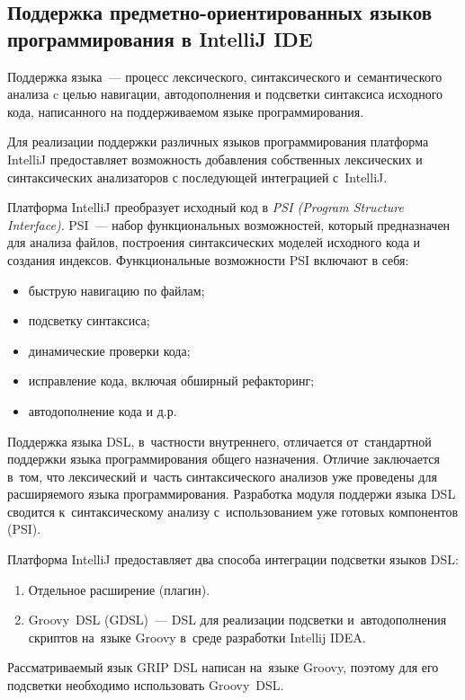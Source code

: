 \subsection{Поддержка предметно-ориентированных языков программирования в IntelliJ IDE} \label{sub132}

Поддержка языка~--- процесс лексического, синтаксического и~семантического анализа c целью навигации, автодополнения и подсветки синтаксиса исходного кода, написанного на поддерживаемом языке программирования. 

Для реализации поддержки различных языков программирования платформа IntelliJ предоставляет возможность добавления собственных лексических и синтаксических анализаторов с последующей интеграцией с~IntelliJ.

Платформа IntelliJ преобразует исходный код в \textit{PSI (Program Structure Interface)}. PSI~--- набор функциональных возможностей, который предназначен для анализа файлов, построения синтаксических моделей исходного кода и создания индексов. Функциональные возможности PSI включают в себя:

\begin{itemize}
\item{быструю навигацию по файлам;}
\item{подсветку синтаксиса;}
\item{динамические проверки кода;}
\item{исправление кода, включая обширный рефакторинг;}
\item{автодополнение кода и д.р.}
\end{itemize}

Поддержка языка DSL, в~частности внутреннего, отличается от~стандартной поддержки языка программирования общего назначения. Отличие заключается в~том, что лексический и~часть синтаксического анализов уже проведены для расширяемого языка программирования. Разработка модуля поддержи языка DSL сводится к~синтаксическому анализу с~использованием уже готовых компонентов (PSI).

Платформа IntelliJ предоставляет два способа интеграции подсветки языков DSL:
\begin{enumerate}
	\item{Отдельное расширение (плагин).}
	\item{Groovy~DSL (GDSL)~--- DSL для реализации подсветки и~автодополнения скриптов на~языке Groovy в~среде разработки
Intellij IDEA.}
\end{enumerate}

Рассматриваемый язык GRIP DSL написан на~языке Groovy, поэтому для его подсветки необходимо использовать Groovy~DSL.